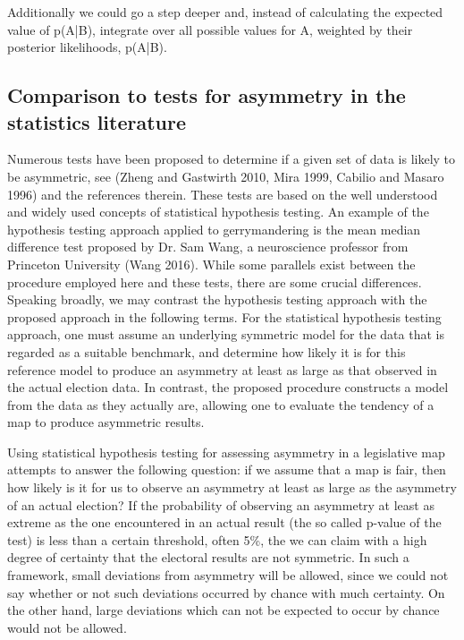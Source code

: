 \documentclass[preprint,12pt]{article}
\begin{document}
Additionally we could go a step deeper and, instead of calculating the expected value of p(A|B), integrate over all possible values for A, weighted by their posterior likelihoods, p(A|B).

\subsection{Comparison to tests for asymmetry in the statistics literature}
 
Numerous tests have been proposed to determine if a given set of data is likely to be asymmetric, see (Zheng and Gastwirth 2010, Mira 1999, Cabilio and Masaro 1996) and the references therein. These tests are based on the well understood and widely used concepts of statistical hypothesis testing. An example of the hypothesis testing approach applied to gerrymandering is the mean median difference test proposed by Dr. Sam Wang, a neuroscience professor from Princeton University (Wang 2016). While some parallels exist between the procedure employed here and these tests, there are some crucial differences. Speaking broadly, we may contrast the hypothesis testing approach with the proposed approach in the following terms. For the statistical hypothesis testing approach, one must assume an underlying symmetric model for the data that is regarded as a suitable benchmark, and determine how likely it is for this reference model to produce an asymmetry at least as large as that observed in the actual election data. In contrast, the proposed procedure constructs a model from the data as they actually are, allowing one to evaluate the tendency of a map to produce asymmetric results. 
 
Using statistical hypothesis testing for assessing asymmetry in a legislative map attempts to answer the following question: if we assume that a map is fair, then how likely is it for us to observe an asymmetry at least as large as the asymmetry of an actual election? If the probability of observing an asymmetry at least as extreme as the one encountered in an actual result (the so called p-value of the test) is less than a certain threshold, often 5\%, the we can claim with a high degree of certainty that the electoral results are not symmetric. In such a framework, small deviations from asymmetry will be allowed, since we could not say whether or not such deviations occurred by chance with much certainty. On the other hand, large deviations which can not be expected to occur by chance would not be allowed.
 
\end{document}
